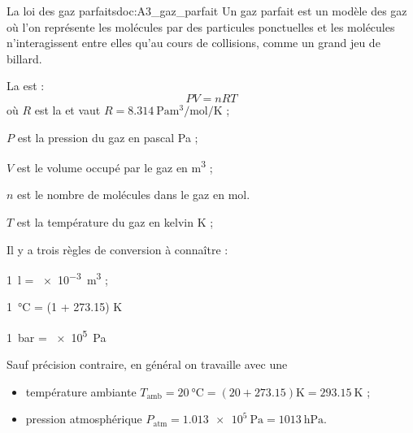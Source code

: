 \begin{doc}{La loi des gaz parfaits}{doc:A3_gaz_parfait}
  Un gaz parfait est un modèle des gaz où l'on représente les molécules par des particules ponctuelles et les molécules n'interagissent entre elles qu'au cours de collisions, comme un grand jeu de billard.
  
  \begin{importants}
    La  est :
    \begin{equation*}
      PV = nRT
    \end{equation*}
    où $R$ est la  et vaut $R = \qty{8,314}{\pascal \m\cubed \per\mole \per\kelvin}$ ;
    \begin{listePoints}
      \item $P$ est la pression du gaz en pascal \unit{\pascal} ;
      \item $V$ est le volume occupé par le gaz en \unit{\m\cubed} ;
      \item $n$ est le nombre de molécules dans le gaz en \unit{\mole}.
      \item $T$ est la température du gaz en kelvin \unit{\kelvin} ;
    \end{listePoints}
  \end{importants}

  Il y a trois règles de conversion à connaître :
  \begin{listePoints}
    \item \qty{1}{\litre} = \qty{e-3}{\m\cubed} ;
    \item \qty{1}{\degreeCelsius} = (1 + \num{273,15}) \unit{\kelvin}
    \item \qty{1}{\bar} = \qty{e5}{\pascal}
  \end{listePoints}

  Sauf précision contraire, en général on travaille avec une
  \begin{itemize}
    \item température ambiante $T_\text{amb} = \qty{20}{\degreeCelsius} 
      = (20 + \num{273,15}) \unit{\kelvin}
      = \qty{293,15}{\kelvin}$ ;
    \item pression atmosphérique $P_\text{atm} = \qty{1,013e5}{\pascal} = \qty{1013}{\hecto\pascal}$.
  \end{itemize}
  
  
\end{doc}



